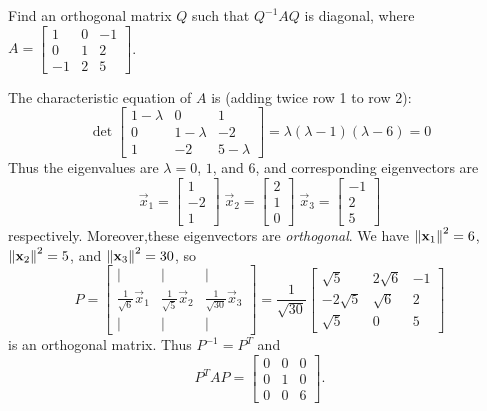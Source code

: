 \documentclass{ximera}
\begin{document}
\begin{example}\label{ex:DiagonalizeSymmetricMatrix}
Find an orthogonal matrix $Q$ such that $Q^{-1}AQ$ is diagonal, where $A = \begin{bmatrix}
1 & 0 & -1 \\
0 & 1 & 2 \\
-1 & 2 & 5
\end{bmatrix}$.

\begin{explanation}
 The characteristic equation of $A$ is (adding twice row 1 to row 2):
\begin{equation*}
\det \begin{bmatrix}
1-\lambda & 0 & 1 \\
0 & 1-\lambda & -2 \\
1 & -2 & 5-\lambda
\end{bmatrix} = \lambda(\lambda - 1)(\lambda - 6)=0
\end{equation*}
Thus the eigenvalues are $\lambda = 0$, $1$, and $6$, and corresponding eigenvectors are
\begin{equation*}
\vec{x}_{1} = \begin{bmatrix}
1 \\
-2 \\
1
\end{bmatrix} \;
\vec{x}_{2} = \begin{bmatrix}
2 \\
1 \\
0
\end{bmatrix} \;
\vec{x}_{3} = \begin{bmatrix}
-1 \\
2 \\
5
\end{bmatrix}
\end{equation*}
respectively. Moreover,these eigenvectors are \textit{orthogonal}. We have $\left\lVert\mathbf{x}_{1}\right\rVert^{2} = 6$, $\left\lVert\mathbf{x}_{2}\right\rVert^{2} = 5$, and $\left\lVert\mathbf{x}_{3}\right\rVert^{2} = 30$, so
\begin{equation*}
P = \begin{bmatrix}
| & | &  | \\
\frac{1}{\sqrt{6}}\vec{x}_{1} & \frac{1}{\sqrt{5}}\vec{x}_{2} & \frac{1}{\sqrt{30}}\vec{x}_{3} \\
| & | &  | 
\end{bmatrix} = \frac{1}{\sqrt{30}} \begin{bmatrix}
\sqrt{5} & 2\sqrt{6} & -1 \\
-2\sqrt{5} & \sqrt{6} & 2 \\
\sqrt{5} & 0 & 5
\end{bmatrix}
\end{equation*}
is an orthogonal matrix. Thus $P^{-1} = P^{T}$ and
\begin{equation*}
P^TAP = \begin{bmatrix}
0 & 0 & 0 \\
0 & 1 & 0 \\
0 & 0 & 6
\end{bmatrix}.
\end{equation*}

\end{explanation}
\end{example}
\end{document}
